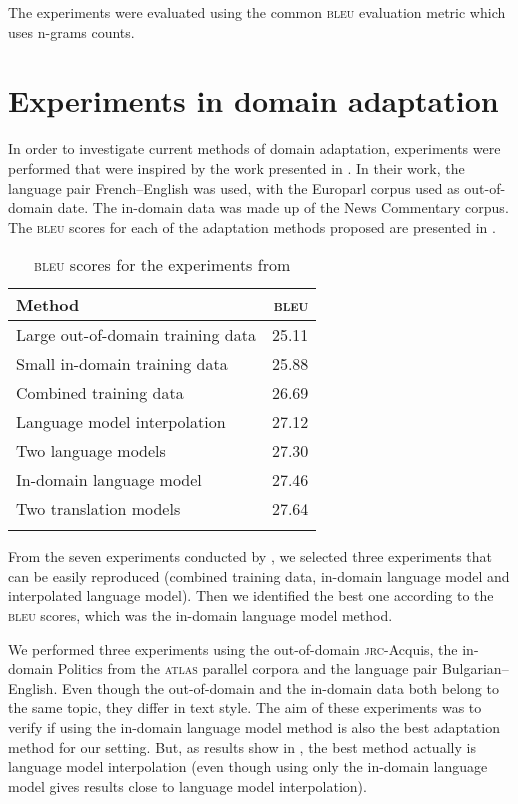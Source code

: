 \documentclass[output=paper]{LSP/langsci}
\begin{document}
The experiments were evaluated using the common \textsc{bleu} evaluation metric which uses n-grams counts. 

\section{Experiments in domain adaptation}\label{sec:dumavertan:5}

In order to investigate current methods of domain adaptation, experiments were performed that were inspired by the work presented in \citet{Koehn2007}. In their work, the language pair French--English was used, with the Europarl corpus  used as out-of-domain date. The in-domain data was made up of the News Commentary corpus. The \textsc{bleu} scores for each of the adaptation methods proposed are presented in . 

\begin{table}
\begin{tabular}{lr}
\lsptoprule
 {Method} & {\textsc{bleu}}\\
 \midrule
 Large out-of-domain training data & 25.11\\
 Small in-domain training data & 25.88\\
 Combined training data & 26.69\\
 Language model interpolation & 27.12\\
  Two language models & 27.30\\
 In-domain language model & 27.46\\
 Two translation models & 27.64\\
\lspbottomrule
\end{tabular}
\caption{\textsc{bleu} scores for the experiments from \citet{Koehn2007}}
\label{tab:dumavertan:2}
\end{table}

From the seven experiments conducted by \citet{Koehn2007}, we selected three experiments that can be easily reproduced (combined training data, in-domain language model and interpolated language model). Then we identified the best one according to the \textsc{bleu} scores, which was the in-domain language model method.   

We performed three experiments using the out-of-domain \textsc{jrc}-Acquis, the in-domain Politics from the \textsc{atlas} parallel corpora  and the language pair Bulgarian--English. Even though the out-of-domain and the in-domain data both belong to the same topic, they differ in text style. The aim of these experiments was to verify if using the in-domain language model method is also the best adaptation method for our setting. But, as results show in , the best method actually is language model interpolation (even though using only the in-domain language model gives results close to language model interpolation). 
\end{document}
